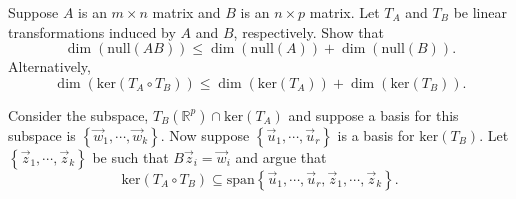 \documentclass{ximera}
\begin{document}
\begin{problem}\label{prb:5.30} Suppose $A$ is an $m\times n$ matrix and $B$ is an $n\times p$ matrix.  Let $T_A$ and $T_B$ be linear transformations induced by $A$ and $B$, respectively.
Show that
\begin{equation*}
\dim \left( \mbox{null} \left( AB\right) \right) \leq \dim \left( \mbox{null} \left(
A\right) \right) +\dim \left( \mbox{null} \left( B\right) \right) .
\end{equation*}
Alternatively,
\begin{equation*}
\dim \left( \mbox{ker} \left( T_A\circ T_B\right) \right) \leq \dim \left( \mbox{ker} \left(
T_A\right) \right) +\dim \left( \mbox{ker} \left( T_B\right) \right) .
\end{equation*}

 
\begin{hint}
Consider the subspace, $T_B\left( \mathbb{R}^{p}\right) \cap
\mbox{ker} \left( T_A\right) $ and suppose a basis for this subspace is $\left\{
\vec{w}_{1},\cdots ,\vec{w}_{k}\right\} .$ Now suppose $\left\{
\vec{u}_{1},\cdots ,\vec{u}_{r}\right\} $ is a basis for $\mbox{ker} \left(
T_B\right) .$ Let $\left\{ \vec{z}_{1},\cdots ,\vec{z}_{k}\right\} $ be
such that $B\vec{z}_{i}=\vec{w}_{i}$ and argue that
\begin{equation*}
\mbox{ker} \left( T_A\circ T_B\right) \subseteq \mbox{span}\left\{ \vec{u}_{1},\cdots ,
\vec{u}_{r},\vec{z}_{1},\cdots ,\vec{z}_{k}\right\} .
\end{equation*}
\end{hint}


\end{problem}
\end{document}
